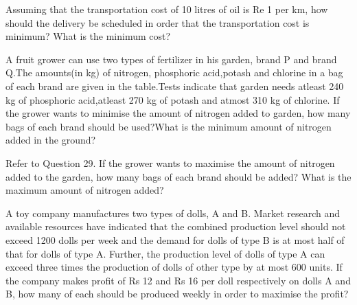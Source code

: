 Assuming that the transportation cost of 10 litres of oil is Re 1 per km, how
should the delivery be scheduled in order that the transportation cost is minimum?
What is the minimum cost?\\
\item A fruit grower can use two types of fertilizer in his garden, brand P and brand Q.The amounts(in kg) of nitrogen, phosphoric acid,potash and chlorine in a bag of each brand are given in the table.Tests indicate that garden needs atleast 240 kg of phosphoric acid,atleast 270 kg of potash and atmost 310 kg of chlorine. If the grower wants to minimise the amount of nitrogen added to garden, how many bags of each brand should be used?What is the minimum amount of nitrogen added in the ground?

\begin{table}[!ht]
\centering
{}
\caption{kg per bag}
\label{opt/30/tab:table1}
\end{table}
%
\solution


\item Refer to Question 29. If the grower wants to maximise the amount of nitrogen
added to the garden, how many bags of each brand should be added? What is
the maximum amount of nitrogen added?\\
\item A toy company manufactures two types of dolls, A and B. Market research and
available resources have indicated that the combined production level should not
exceed 1200 dolls per week and the demand for dolls of type B is at most half of that
for dolls of type A. Further, the production level of dolls of type A can exceed three
times the production of dolls of other type by at most 600 units. If the company
makes profit of Rs 12 and Rs 16 per doll respectively on dolls A and B, how many of
each should be produced weekly in order to maximise the profit?
%
\solution


